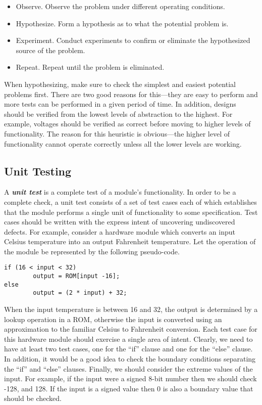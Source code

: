 \begin{itemize}
\item
  Observe. Observe the problem under different operating conditions.
\item
  Hypothesize. Form a hypothesis as to what the potential problem is.
\item
  Experiment. Conduct experiments to confirm or eliminate the
  hypothesized source of the problem.
\item
  Repeat. Repeat until the problem is eliminated.
\end{itemize}

When hypothesizing, make sure to check the simplest and easiest
potential problems first. There are two good reasons for this---they are
easy to perform and more tests can be performed in a given period of
time. In addition, designs should be verified from the lowest levels of
abstraction to the highest. For example, voltages should be verified as
correct before moving to higher levels of functionality. The reason for
this heuristic is obvious---the higher level of functionality cannot
operate correctly unless all the lower levels are working.

\subsection{Unit Testing}
\label{subsection:unit-testing}

A \emph{\textbf{unit test}} is a complete test of a module's
functionality. In order to be a complete check, a unit test consists of
a set of test cases each of which establishes that the module performs a
single unit of functionality to some specification. Test cases should be
written with the express intent of uncovering undiscovered defects. For
example, consider a hardware module which converts an input Celsius
temperature into an output Fahrenheit temperature. Let the operation of
the module be represented by the following pseudo-code.

\begin{verbatim}
if (16 < input < 32)
        output = ROM[input -16];
else
        output = (2 * input) + 32;
\end{verbatim}

When the input temperature is between 16 and 32, the output is
determined by a lookup operation in a ROM, otherwise the input is
converted using an approximation to the familiar Celsius to Fahrenheit
conversion. Each test case for this hardware module should exercise a
single area of intent. Clearly, we need to have at least two test cases,
one for the ``if'' clause and one for the ``else'' clause. In addition,
it would be a good idea to check the boundary conditions separating the
``if'' and ``else'' clauses. Finally, we should consider the extreme
values of the input. For example, if the input were a signed 8-bit
number then we should check -128, and 128. If the input is a signed
value then 0 is also a boundary value that should be checked.


